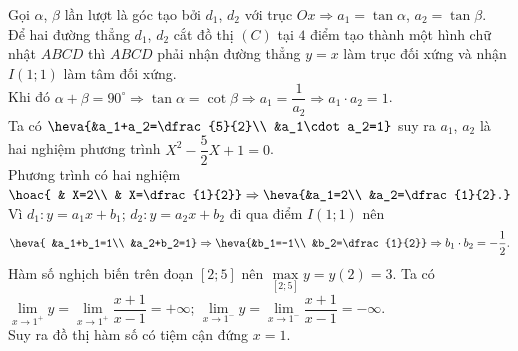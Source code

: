 \begin{ex}
{\begin{itemchoice}
\begin{center}
			\end{center}
			Gọi $\alpha$, $\beta$ lần lượt là góc tạo bởi $d_1$, $d_2$ với trục $Ox\Rightarrow{a_1}=\tan\alpha$, $a_2=\tan\beta $.\\
			Để hai đường thẳng $d_1$, $d_2$ cắt đồ thị $(C)$ tại $4$ điểm tạo thành một hình chữ nhật $ABCD$ thì $ABCD$ phải nhận đường thẳng $y=x$ làm trục đối xứng và nhận $I(1;1)$ làm tâm đối xứng.\\
			Khi đó $\alpha+\beta=90^\circ\Rightarrow\tan\alpha=\cot\beta\Rightarrow{a_1}=\dfrac{1}{a_2}\Rightarrow a_1\cdot a_2=1$.\\
			Ta có $\heva{&a_1+a_2=\dfrac{5}{2}\\ 
				&a_1\cdot a_2=1}$ suy ra $a_1$, $a_2$ là hai nghiệm phương trình $X^2-\dfrac{5}{2}X+1=0$.\\
			Phương trình có hai nghiệm $\hoac{
				& X=2\\ 
				& X=\dfrac{1}{2}}\Rightarrow\heva{&a_1=2\\ 
				&a_2=\dfrac{1}{2}.}$\\
			Vì $d_1\colon y=a_1x+b_1$; $d_2\colon y=a_2x+b_2$ đi qua điểm $I(1;1)$ nên 
			$$\heva{
				&a_1+b_1=1\\ 
				&a_2+b_2=1}\Rightarrow\heva{&b_1=-1\\ 
				&b_2=\dfrac{1}{2}}\Rightarrow b_1\cdot b_2=-\dfrac{1}{2}.$$
			\itemch Hàm số nghịch biến trên đoạn $[2;5]$ nên $\max\limits_{[2;5]}y=y(2)=3$.
			\itemch Ta có $\lim\limits_{x\to1^+}y=\lim\limits_{x\to1^+}\dfrac{x+1}{x-1}=+\infty $; $\lim\limits_{x\to1^-}y=\lim\limits_{x\to1^-}\dfrac{x+1}{x-1}=-\infty $.\\
			Suy ra đồ thị hàm số có tiệm cận đứng $x=1$.
		\end{itemchoice}
	}
\end{ex}

